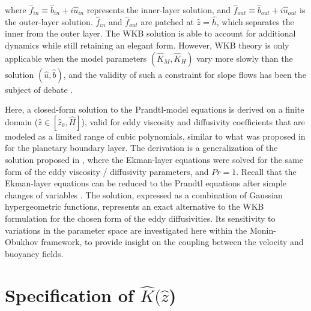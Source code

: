 %
where $\hat{f}_{in} \equiv \hat{b}_{in}+ i\hat{u}_{in}$ represents the inner-layer solution, and $\hat{f}_{out} \equiv \hat{b}_{out} + i\hat{u}_{out}$ is the outer-layer solution. $\hat{f}_{in}$ and $\hat{f}_{out}$ are patched at $\hat{z}=\hat{h}$, which separates the inner from the outer layer.
The WKB solution is able to account for additional dynamics while still retaining an elegant form.
However, WKB theory is only applicable when the model parameters $(\hat{K}_M,\hat{K}_H)$ vary more slowly than the solution $(\hat{u},\hat{b})$, and the validity of such a constraint for slope flows has been the subject of debate \citep{Grisogono2002}.

Here, a closed-form solution to the Prandtl-model equations is derived on a finite domain ($\hat{z} \in [\hat{z}_0,\hat{H}]$), valid for eddy viscosity and diffusivity coefficients that are modeled as a limited range of cubic polynomials, similar to what was proposed in \citet{O'Brien1970} for the planetary boundary layer. 
The derivation is a generalization of the solution proposed in \citet{Nieuwstadt1983a}, where the Ekman-layer equations were solved for the same form of the eddy viscosity / diffusivity parameters, and $Pr=1$.
Recall that the Ekman-layer equations can be reduced to the Prandtl equations after simple changes of variables \citep{Veronis1970}. 
The solution, expressed as a combination of Gaussian hypergeometric functions, represents an exact alternative to the WKB formulation for the chosen form of the eddy diffusivities. 
Its sensitivity to variations in the parameter space are investigated here within the Monin-Obukhov framework, to provide insight on the coupling between the velocity and buoyancy fields.



\section{Specification of $\hat{K}(\hat{z}$)}



